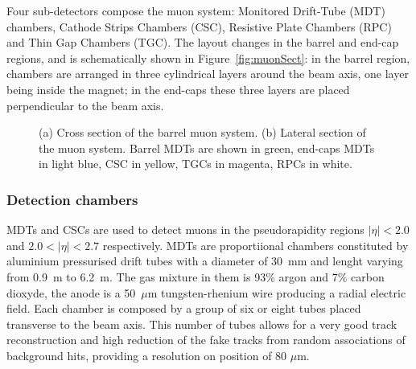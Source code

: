 Four sub-detectors compose the muon system: Monitored Drift-Tube (MDT) chambers, 
Cathode Strips Chambers (CSC), Resistive Plate Chambers (RPC) and Thin Gap Chambers (TGC).
The layout changes in the barrel and end-cap regions, and is schematically shown in 
Figure~\ref{fig:muonSect}: in the  barrel region, chambers are arranged in three cylindrical layers around
the beam axis, one layer being inside the magnet; in the end-caps these three layers are placed 
perpendicular to the beam axis.

\begin{figure}[tb]\begin{center}
	\caption{(a) Cross section of the barrel muon system. (b) Lateral section of the muon system. 
        Barrel MDTs are shown in green, end-caps MDTs in light blue, CSC in yellow, 
        TGCs in magenta, RPCs in white.%
        }
\end{center}\end{figure}


\subsubsection{Detection chambers}

MDTs and CSCs are used to detect muons in the pseudorapidity regions $|\eta|<2.0$ and
$2.0<|\eta|<2.7$ respectively. MDTs are proportiional chambers constituted by aluminium
pressurised drift tubes with a diameter of 30~mm and lenght varying from 0.9~m to 6.2~m. 
The gas mixture in them is 93\% argon and 7\% carbon dioxyde, the anode is a 50~$\mu$m
tungsten-rhenium wire producing a radial electric field. Each chamber is composed by 
a group of six or eight tubes placed transverse to the beam axis. This number of tubes allows
for a very good track reconstruction and high reduction of the fake tracks from random 
associations of background hits, providing a resolution on position of 80 $\mu$m.


